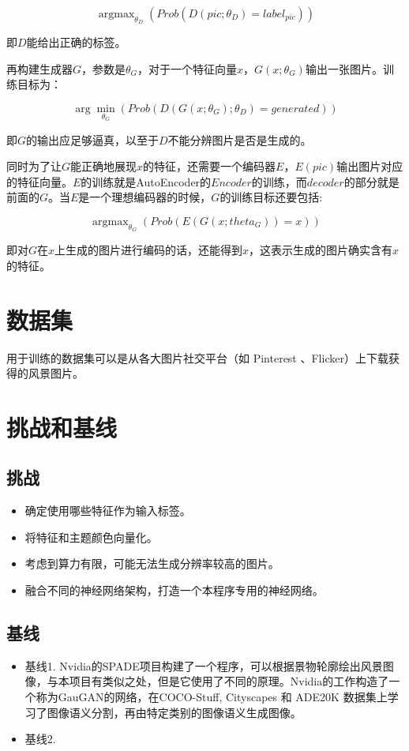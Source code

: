 \documentclass{article}
\begin{document}
$$\mathop{\arg\max}_{\theta_D}(Prob(D(pic; \theta_D)=label_{pic}))$$

即$D$能给出正确的标签。

再构建生成器$G$，参数是$\theta_G$，对于一个特征向量$x$，$G(x; \theta_G)$输出一张图片。训练目标为：

$$\arg\min_{\theta_G}(Prob(D(G(x; \theta_G); \theta_D)=generated))$$

即$G$的输出应足够逼真，以至于$D$不能分辨图片是否是生成的。

同时为了让$G$能正确地展现$x$的特征，还需要一个编码器$E$，$E(pic)$输出图片对应的特征向量。$E$的训练就是AutoEncoder的$Encoder$的训练，而$decoder$的部分就是前面的$G$。当$E$是一个理想编码器的时候，$G$的训练目标还要包括:

$$\mathop{\arg\max}_{\theta_G}(Prob(E(G(x; theta_G))=x))$$

即对$G$在$x$上生成的图片进行编码的话，还能得到$x$，这表示生成的图片确实含有$x$的特征。


\section{数据集}

用于训练的数据集可以是从各大图片社交平台（如 Pinterest 、Flicker）上下载获得的风景图片。

\section{挑战和基线}

\subsection{挑战}
\begin{itemize}
	\item 确定使用哪些特征作为输入标签。
	\item 将特征和主题颜色向量化。
	\item 考虑到算力有限，可能无法生成分辨率较高的图片。
	\item 融合不同的神经网络架构，打造一个本程序专用的神经网络。
\end{itemize}

\subsection{基线}

\begin{itemize}

\item 基线1.
Nvidia的SPADE项目构建了一个程序，可以根据景物轮廓绘出风景图像，与本项目有类似之处，但是它使用了不同的原理。Nvidia的工作构造了一个称为GauGAN的网络，在COCO-Stuff, Cityscapes 和 ADE20K 数据集上学习了图像语义分割，再由特定类别的图像语义生成图像。
\item 基线2.

\end{itemize}
\end{document}
